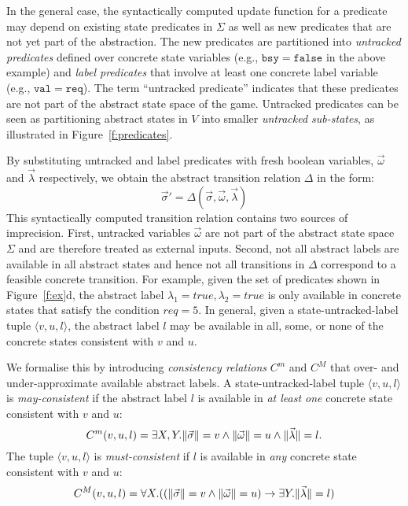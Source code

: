 \documentclass[a4paper,twoside,openright,11pt]{book}
\newcommand{\vect}[1]{\vec{#1}}
\theoremstyle{definition}
\begin{document}
In the general case, the syntactically computed update function 
for a predicate may depend on existing state predicates in 
$\Sigma$ as well as new predicates that are not yet part of the 
abstraction.  The new predicates are partitioned into 
\emph{untracked predicates} defined over concrete state variables 
(e.g., $\mathtt{bsy=false}$ in the above example) and \emph{label 
predicates} that involve at least one concrete label variable 
(e.g., $\mathtt{val=req}$).  The term ``untracked predicate'' 
indicates that these predicates are not part of the 
abstract state space of the game.  Untracked predicates can be 
seen as partitioning abstract states in $V$ into smaller 
\emph{untracked sub-states}, as illustrated in 
Figure~\ref{f:predicates}.

By substituting untracked and label predicates with fresh boolean 
variables, $\vect{\omega}$ and $\vect{\lambda}$ respectively, we 
obtain the abstract transition relation $\Delta$ in the form:
$$
\vect{\sigma}'=\Delta(\vect{\sigma},\vect{\omega},\vect{\lambda})
$$
This syntactically computed transition relation contains two 
sources of imprecision.  First, untracked variables 
$\vect{\omega}$ are not part of the abstract state space $\Sigma$ 
and are therefore treated as external inputs.  
Second, not all abstract labels  
are available in all abstract states and hence 
not all transitions in $\Delta$ correspond to a feasible concrete 
transition.  For example, given the set of predicates shown in 
Figure~\ref{f:ex}d, the abstract label $\lambda_1 = true, 
\lambda_2 = true$ is only available in concrete states that 
satisfy the condition $req=5$.  In general, given a 
state-untracked-label tuple $\langle v,u,l\rangle$, the abstract 
label $l$ may be available in all, some, or none of the concrete 
states consistent with $v$ and $u$.  

We formalise this by introducing \emph{consistency relations} 
$C^m$ and $C^M$ that over- and under-approximate available 
abstract labels.  A state-untracked-label tuple $\langle 
v,u,l\rangle$ is \emph{may-consistent} if the abstract label $l$ 
is available in \emph{at least one} concrete state consistent with 
$v$ and $u$:
\begin{equation} \label{e:Cm}
    \small
    C^m(v,u,l) = \exists X,Y. \|\vect{\sigma}\|=v \land \|\vect{\omega}\|=u \land \|\vect{\lambda}\|=l.
\end{equation}
The tuple $\langle v,u,l\rangle$ is \emph{must-consistent} if $l$ 
is available in \emph{any} concrete state consistent with $v$ and 
$u$:
\begin{equation}
    \small
    C^M(v,u,l) = \forall X . ((\|\vect{\sigma}\|=v \land \|\vect{\omega}\|=u) \rightarrow \exists Y.  \|\vect{\lambda}\|=l)
\end{equation}
\end{document}
